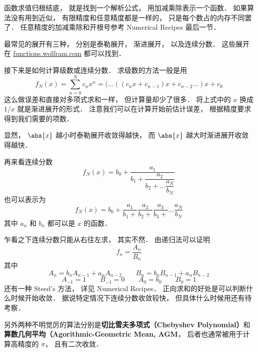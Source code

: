 
函数求值归根结底， 就是找到一个解析公式， 用加减乘除表示一个函数． 如果算法没有用到近似， 有限精度和任意精度都是一样的， 只是每个数占的内存不同罢了． 任意精度的加减乘除和开根号参考 Numerical Recipes 最后一节．

最常见的展开有三种， 分别是泰勒展开， 渐进展开， 以及连续分数． 这些展开在 \href{http://functions.wolfram.com}{functions.wolfram.com} 都可以找到．

接下来是如何计算级数或连续分数． 求级数的方法一般是用
\begin{equation}
f_N(x) = \sum_{n = 0}^N c_n x^n = (\dots ((c_n x + c_{n-1})x + c_{n-2} \dots )x + c_0
\end{equation}
这么做误差和直接对多项式求和一样， 但计算量却少了很多． 将上式中的 $x$ 换成 $1/x$ 就是渐进展开的形式． 注意我们可以在计算开始前估计误差， 根据精度要求得到我们需要的项数．

显然， $\abs{x}$ 越小时泰勒展开收敛得越快， 而 $\abs{x}$ 越大时渐进展开收敛得越快．

再来看连续分数
\begin{equation}
f_N(x) = b_0 + \dfrac{a_1}{b_1 + \dfrac{a_2}{b_2 + \dots \dfrac{a_N}{b_N}}}
\end{equation}
也可以表示为
\begin{equation}
f_N(x) = b_0 + \frac{a_1}{b_1 +} \frac{a_2}{b_2 +} \frac{a_3}{b_3 +} \dots \frac{a_N}{b_N}
\end{equation}
其中 $a_n$ 和 $b_n$ 都可以是 $x$ 的函数．

乍看之下连续分数只能从右往左求， 其实不然． 由递归法可以证明
\begin{equation}
f_n = \frac{A_n}{B_n}
\end{equation}
其中
\begin{equation}
A_n = b_n A_{n-1} + a_n A_{n-2} \qquad
B_n = b_n B_{n-1} + a_n B_{n-2}
\end{equation}
\begin{equation}
A_{-1} = 1 \qquad B_{-1} = 0
\qquad A_0 = b_0 \qquad B_0 = 1
\end{equation}
还有一种 Steed's 方法， 详见 Numerical Recipes． 正向求和的好处是可以判断什么时候开始收敛．
据说特定情况下连续分数收敛较快， 但具体什么时候用还有待考察．

另外两种不明觉厉的算法分别是\textbf{切比雪夫多项式（Chebyshev Polynomial）}和\textbf{算数几何平均（Agorithmic-Geometric Mean, AGM}， 后者也通常被用于计算高精度的 $\pi$， 且有二次收敛．
